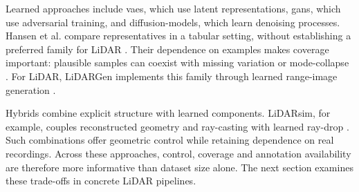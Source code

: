 Learned approaches include \glspl{vae}, which use latent representations,
\glspl{gan}, which use adversarial training, and \glspl{diffusion-model},
which learn denoising processes. Hansen et al. compare representatives in
a tabular setting, without establishing a preferred family for LiDAR
\parencite{hansenReimaginingSyntheticTabular2023}.
Their dependence on examples makes coverage important: plausible samples
can coexist with missing variation or \gls{mode-collapse}
\parencite{breugelSyntheticDataReal2023}. For LiDAR, LiDARGen implements
this family through learned range-image generation
\parencite{zyrianovLearningGenerateRealistic2022}.

Hybrids combine explicit structure with learned components. LiDARsim, for
example, couples reconstructed geometry and \gls{ray-casting} with learned
\gls{ray-drop} \parencite{manivasagamLiDARsimRealisticLiDAR2020}.
Such combinations offer geometric control while retaining dependence on
real recordings. Across these approaches, control, coverage and annotation
availability are therefore more informative than dataset size alone.
The next section examines these trade-offs in concrete LiDAR pipelines.
